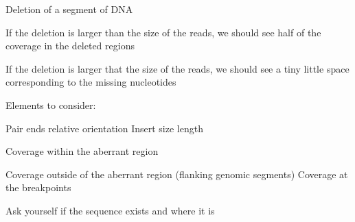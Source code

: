 Deletion of a segment of DNA

If the deletion is larger than the size of the reads, we should see half of the
coverage in the deleted regions

If the deletion is larger that the size of the reads, we should see a tiny
little space corresponding to the missing nucleotides

Elements to consider:

Pair ends relative orientation Insert size length

Coverage within the aberrant region

Coverage outside of the aberrant region (flanking genomic segments) Coverage at
the breakpoints

Ask yourself if the sequence exists and where it is

